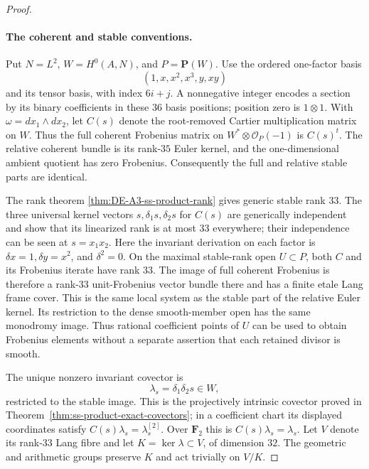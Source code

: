 \begin{proof}
\paragraph{The coherent and stable conventions.}
Put $N=L^2$, $W=H^0(A,N)$, and $P=\mathbf P(W)$.
Use the ordered one-factor basis
\[
             (1,x,x^2,x^3,y,xy)
\]
and its tensor basis, with index $6i+j$.
A nonnegative integer encodes a section by its binary coefficients in
these $36$ basis positions; position zero is $1\otimes1$.
With $\omega=dx_1\wedge dx_2$, let $C(s)$ denote the root-removed Cartier
multiplication matrix on $W$. Thus the full coherent Frobenius matrix
on $W^*\otimes\mathcal O_P(-1)$ is $C(s)^t$.
The relative coherent bundle is its rank-$35$ Euler kernel, and the
one-dimensional ambient quotient has zero Frobenius. Consequently the
full and relative stable parts are identical.

The rank theorem \ref{thm:DE-A3-ss-product-rank} gives generic stable rank
$33$. The three universal kernel vectors
$s,\delta_1s,\delta_2s$ for $C(s)$ are generically independent and show
that its linearized rank is at most $33$ everywhere; their independence
can be seen at $s=x_1x_2$. Here the invariant derivation on each factor is
$\delta x=1,\delta y=x^2$, and $\delta^2=0$.
On the maximal stable-rank open $U\subset P$, both $C$ and its Frobenius
iterate have rank $33$. The image of full coherent Frobenius is therefore
a rank-$33$ unit-Frobenius vector bundle there and has a finite etale Lang
frame cover. This is the same local system as the stable part of the
relative Euler kernel. Its restriction to the dense smooth-member open
has the same monodromy image. Thus rational coefficient points of $U$
can be used to obtain Frobenius elements without a separate assertion
that each retained divisor is smooth.

The unique nonzero invariant covector is
\[
                       \lambda_s=\delta_1\delta_2s\in W,
\]
restricted to the stable image. This is the projectively intrinsic
covector proved in Theorem~\ref{thm:ss-product-exact-covectors}; in a
coefficient chart its displayed coordinates satisfy
$C(s)\lambda_s=\lambda_s^{[2]}$.
Over $\mathbf F_2$ this is $C(s)\lambda_s=\lambda_s$.
Let $V$ denote its rank-$33$ Lang fibre and let
$K=\ker\lambda\subset V$, of dimension $32$.
The geometric and arithmetic groups preserve $K$ and act trivially on
$V/K$.


\end{proof}

